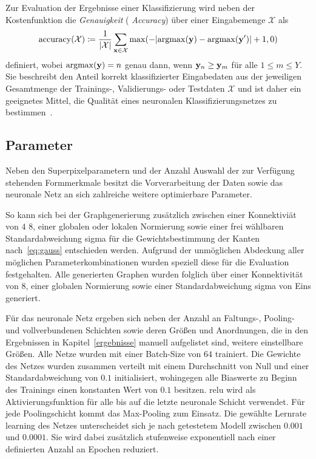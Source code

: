 Zur Evaluation der Ergebnisse einer Klassifizierung wird neben der Kostenfunktion die \emph{Genauigkeit} (\engl{} \emph{Accuracy}) über einer Eingabemenge $\mathcal{X}$ als
\begin{equation*}
  \mathrm{accuracy}\left(\mathcal{X}\right) \coloneqq \frac{1}{\left|\mathcal{X}\right|}\sum_{\ve{x} \in \mathcal{X}} \max \left( - \left| \mathrm{argmax}\left(\ve{y}\right) - \mathrm{argmax}\left(\ve{y}^{\prime}\right) \right| + 1, 0 \right)
\end{equation*}
definiert, wobei $\mathrm{argmax}\left(\ve{y}\right) = n$ genau dann, wenn $\mathbf{y}_n \geq \mathbf{y}_m$ für alle $1 \leq m \leq Y$.
Sie beschreibt den Anteil korrekt klassifizierter Eingabedaten aus der jeweiligen Gesamtmenge der Trainings-, Validierungs- oder Testdaten $\mathcal{X}$ und ist daher ein geeignetes Mittel, die Qualität eines neuronalen Klassifizierungsnetzes zu bestimmen~\cite{Nielsen}.

\subsection{Parameter}
\label{parameter}

Neben den Superpixelparametern und der Anzahl \bzw{} Auswahl der zur Verfügung stehenden Formmerkmale besitzt die Vorverarbeitung der Daten sowie das neuronale Netz an sich zahlreiche weitere optimierbare Parameter.

So kann sich \zB{} bei der Graphgenerierung zusätzlich zwischen einer Konnektiviät von $4$ \bzw{} $8$, einer globalen oder lokalen Normierung sowie einer frei wählbaren Standardabweichung \gls{sigma} für die Gewichtsbestimmung der Kanten nach~\eqref{eq:gauss} entschieden werden.
Aufgrund der unmöglichen Abdeckung aller möglichen Parameterkombinationen wurden speziell diese für die Evaluation festgehalten.
Alle generierten Graphen wurden folglich über einer Konnektivität von $8$, einer globalen Normierung sowie einer Standardabweichung \gls{sigma} von Eins generiert.

Für das neuronale Netz ergeben sich neben der Anzahl an Faltungs-, Pooling- und vollverbundenen Schichten sowie deren Größen und Anordnungen, die in den Ergebnissen in Kapitel~\ref{ergebnisse} manuell aufgelistet sind, weitere einstellbare Größen.
Alle Netze wurden mit einer Batch-Size von $64$ trainiert.
Die Gewichte des Netzes wurden zusammen verteilt mit einem Durchschnitt von Null und einer Standardabweichung von $0.1$ initialisiert, wohingegen alle Biaswerte zu Beginn des Trainings einen konstanten Wert von  $0.1$ besitzen.
\gls{relu} wird als Aktivierungsfunktion für alle bis auf die letzte neuronale Schicht verwendet.
Für jede Poolingschicht kommt das Max-Pooling zum Einsatz.
Die gewählte Lernrate \gls{learning} des Netzes unterscheidet sich je nach getestetem Modell zwischen $0.001$ und $0.0001$.
Sie wird dabei zusätzlich stufenweise exponentiell nach einer definierten Anzahl an Epochen reduziert.

